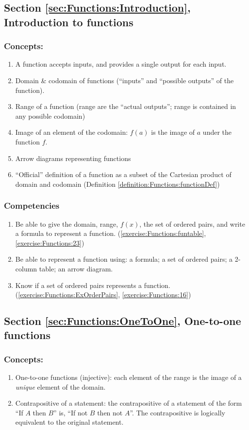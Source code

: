 \subsection*{Section \ref{sec:Functions:Introduction}, Introduction to functions}
\subsubsection*{Concepts:}
\begin{enumerate}
\item A function accepts inputs, and provides a single output for each input.
\item 
Domain \& codomain of functions (``inputs'' and ``possible outputs'' of the function). 
\item
Range of a function (range are the ``actual outputs''; range is contained in any possible codomain)
\item
Image of an element of the codomain:  $f(a)$ is the image of $a$ under the function $f$.
\item
Arrow diagrams representing functions
\item
``Official'' definition of a function as a subset of the Cartesian product of domain and codomain (Definition \ref{definition:Functions:functionDef})
\end{enumerate}

\subsubsection*{Competencies}
\begin{enumerate}
\item
Be able to give the domain, range, $f(x)$, the set of ordered pairs, and write a formula to represent a function. (\ref{exercise:Functions:funtable}, \ref{exercise:Functions:23})
\item
Be able to represent a function using: a formula; a set of ordered pairs; a 2-column table; an arrow diagram.
\item
Know if a set of ordered pairs represents a function.  (\ref{exercise:Functions:ExOrderPairs}, \ref{exercise:Functions:16})
\end{enumerate}


\subsection*{Section \ref{sec:Functions:OneToOne}, One-to-one functions}
\subsubsection*{Concepts:}
\begin{enumerate}
\item 
One-to-one functions (injective): each element of the range is the image of a \emph{unique} element of the domain.
\item
Contrapositive of a statement: the contrapositive of a statement of the form ``If $A$ then $B$'' is, ``If not $B$ then not $A$''.  The contrapositive is logically equivalent to the original statement.
\end{enumerate}

